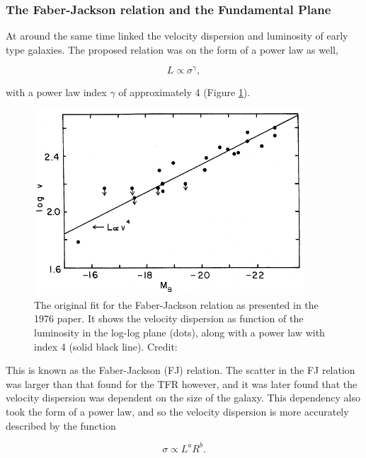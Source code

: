 \subsubsection{The Faber-Jackson relation and the Fundamental Plane}
At around the same time \textcite{TullyFisher1977} linked the velocity dispersion and luminosity of early type galaxies. The proposed relation was on the form of a power law as well,

\begin{equation}
    L \propto \sigma^{\gamma},
\end{equation}

with a power law index $\gamma$ of approximately 4 (Figure \ref{faber_jackson}).

\begin{figure}
    \centering
    \includegraphics[width=0.9\textwidth]{images/faber_jackson.png}
    \caption{The original fit for the Faber-Jackson relation as presented in the 1976 paper. It shows the velocity dispersion as function of the luminosity in the log-log plane (dots), along with a power law with index 4 (solid black line). Credit: \parencite{TullyFisher1977}}
    \label{faber_jackson}
\end{figure}

This is known as the Faber-Jackson (FJ) relation. The scatter in the FJ relation was larger than that found for the TFR however, and it was later found that the velocity dispersion was dependent on the size of the galaxy. This dependency also took the form of a power law, and so the velocity dispersion is more accurately described by the function

\begin{equation}
    \sigma \propto L^a R^b.
\end{equation}

